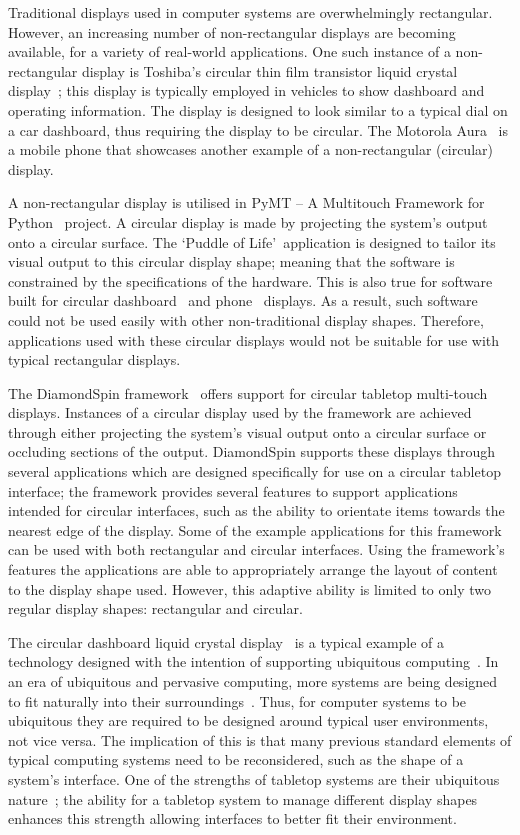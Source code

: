 \documentclass[review,5p,times,twocolumn]{elsarticle}
\begin{document}
Traditional displays used in computer systems are overwhelmingly rectangular.
However, an increasing number of non-rectangular displays are becoming available, for a variety of real-world applications.
One such instance of a non-rectangular display is Toshiba's circular
thin film transistor liquid crystal display~\cite{Boyd2007}; this display is typically employed in vehicles to show dashboard and operating information.
The display is designed to look similar to a typical dial on a car dashboard, thus requiring the display to be circular.
The Motorola Aura~\cite{Finney2009} is a mobile phone that showcases another example of a non-rectangular (circular) display.

A non-rectangular display is utilised in PyMT -- A Multitouch Framework for Python~\cite{Hansen2009} project.
A circular display is made by projecting the system's output onto a circular surface.
The \lq Puddle of Life\rq\ application is designed to tailor its visual output to this circular display shape; meaning that the software is constrained by the specifications of the hardware.
This is also true for software built for circular dashboard~\cite{Boyd2007} and phone~\cite{Finney2009} displays.
As a result, such software could not be used easily with other non-traditional display shapes.
Therefore, applications used with these circular displays would not be suitable for use with typical rectangular displays.

The DiamondSpin framework~\cite{Shen2004} offers support for circular tabletop multi-touch displays.
Instances of a circular display used by the framework are achieved through either projecting the system's visual output onto a circular surface or occluding sections of the output.
DiamondSpin supports these displays through several applications which are designed specifically for use on a circular tabletop interface; the framework provides several features to support applications intended for circular interfaces, such as the ability to orientate items towards the nearest edge of the display.
Some of the example applications for this framework can be used with both rectangular and circular interfaces.
Using the framework's features the applications are able to appropriately arrange the layout of content to the display shape used.
However, this adaptive ability is limited to only two regular display shapes: rectangular and circular.

The circular dashboard liquid crystal display~\cite{Boyd2007} is a typical example of a technology designed with the intention of supporting ubiquitous computing~\cite{Weiser1999}.
In an era of ubiquitous and pervasive computing, more systems are being designed to fit naturally into their surroundings~\cite{Greenfield2006}.
Thus, for computer systems to be ubiquitous they are required to be designed around typical user environments, not vice versa.
The implication of this is that many previous standard elements of typical computing systems need to be reconsidered, such as the shape of a system's interface.
One of the strengths of tabletop systems are their ubiquitous nature~\cite{Smith2012}; the ability for a tabletop system to manage different display shapes enhances this strength allowing interfaces to better fit their environment.
\end{document}
